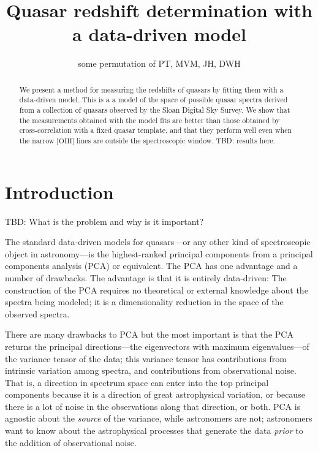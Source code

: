 \documentclass[preprint]{aastex}
\newcounter{address}
\newcommand{\forbidden}[1]{{[}{\mathrm{#1}}{]}}
\newcommand{\OIII}{\forbidden{OIII}}
\begin{document}
\title{Quasar redshift determination with a data-driven model}
\author{some permutation of PT\altaffilmark{\ref{MPIA}},
        MVM\altaffilmark{\ref{MPIA},\ref{Caltech}},
        JH\altaffilmark{\ref{MPIA},\ref{email}},
        DWH\altaffilmark{\ref{MPIA},\ref{CCPP}}}
\setcounter{address}{1}

\begin{abstract}
We present a method for measuring the redshifts of quasars by fitting
them with a data-driven model.  This is a a model of the space of
possible quasar spectra derived from a collection of quasars observed
by the Sloan Digital Sky Survey.  We show that the measurements
obtained with the model fits are better than those obtained by
cross-correlation with a fixed quasar template, and that they perform
well even when the narrow $\OIII$ lines are outside the spectroscopic
window.  TBD: results here.
\end{abstract}

\section{Introduction}

TBD: What is the problem and why is it important?

The standard data-driven models for quasars---or any other kind of
spectroscopic object in astronomy---is the highest-ranked principal
components from a principal components analysis (PCA) or equivalent.
The PCA has one advantage and a number of drawbacks.  The advantage is
that it is entirely data-driven: The construction of the PCA requires
no theoretical or external knowledge about the spectra being modeled;
it is a dimensionality reduction in the space of the observed spectra.

There are many drawbacks to PCA but the most important is that the PCA
returns the principal directions---the eigenvectors with maximum
eigenvalues---of the variance tensor of the data; this variance tensor
has contributions from intrinsic variation among spectra, and
contributions from observational noise.  That is, a direction in
spectrum space can enter into the top principal components because it
is a direction of great astrophysical variation, or because there is a
lot of noise in the observations along that direction, or both.  PCA
is agnostic about the \emph{source} of the variance, while astronomers
are not; astronomers want to know about the astrophysical processes
that generate the data \emph{prior} to the addition of observational
noise.
\end{document}
